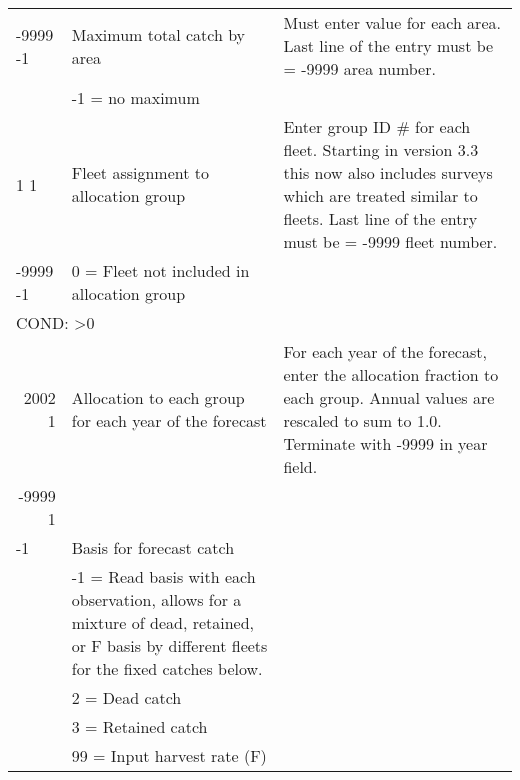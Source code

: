 \begin{landscape}
\begin{longtable}{p{3cm} p{7cm} p{11cm}}
  \hline
  -9999 -1 & Maximum total catch by area & \multirow{1}{1cm}[-0.1cm]{\parbox{11cm}{Must enter value for each area. Last line of the entry must be = -9999 area number.}} \\
     & -1 = no maximum & \\
     
  \hline
  1 1  & Fleet assignment to allocation group & \multirow{1}{1cm}[-0.1cm]{\parbox{11cm}{Enter group ID \# for each fleet. Starting in version 3.3 this now also includes surveys which are treated similar to fleets. Last line of the entry must be = -9999 fleet number.}} \\
  -9999 -1  & 0 = Fleet not included in allocation group & \\
    
  \hline
  \multicolumn{3}{l}{COND: >0 } \\
  \multicolumn{1}{r}{2002 1}  & Allocation to each group for each year of the forecast & For each year of the forecast, enter the allocation fraction to each group. Annual values are rescaled to sum to 1.0. Terminate with -9999 in year field.\\
  \multicolumn{1}{r}{-9999 1} & & \\
  
  
  \pagebreak %

  -1 & Basis for forecast catch & \\
    & -1 = Read basis with each observation, allows for a mixture of dead, retained, or F basis by different fleets for the fixed catches below. & \\
    & 2 = Dead catch & \\
    & 3 = Retained catch & \\
    & 99 = Input harvest rate (F) & \\
    

\end{longtable}
\end{landscape}
